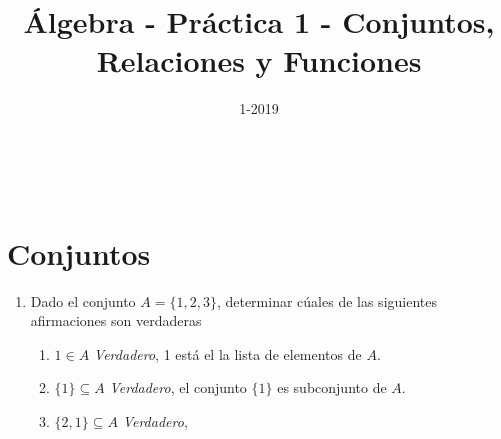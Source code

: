 \documentclass[a4paper,11pt]{article}
\title{Álgebra - Pr\'actica 1 - Conjuntos, Relaciones y Funciones}
\author{}
\date{1-2019}
\makeatletter
\renewcommand{\maketitle}{
\begin{center}
\begin{normalsize}\textbf{\@title}\end{normalsize}\\
\begin{normalsize}\@author\end{normalsize}
\end{center}
}
\makeatother
\begin{document}
\maketitle
\section*{Conjuntos}
    \begin{enumerate}
        \item Dado el conjunto $A=\{1,2,3\}$, determinar cúales de las siguientes afirmaciones son verdaderas
        \begin{enumerate}[label = \roman*)]
                \item $1\in A$ \textit{Verdadero}, 1 está el la lista de elementos de $A$.
                \item $\{1\}\subseteq A$ \textit{Verdadero}, el conjunto $\{1\}$ es subconjunto de $A$.
                \item $\{2,1\}\subseteq A$ \textit{Verdadero}, 
        
    \end{enumerate}
    
\end{enumerate}
\end{document}
